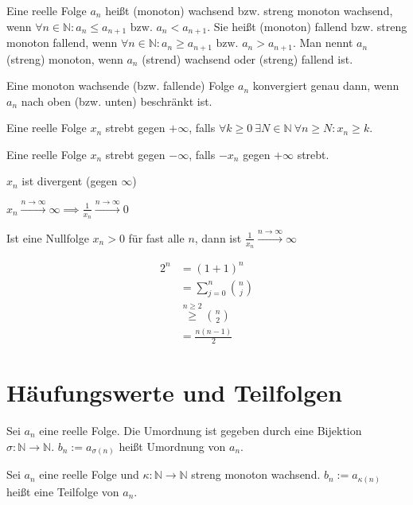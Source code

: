 \begin{definition}
  Eine reelle Folge $a_n$ heißt (monoton) wachsend bzw. streng monoton wachsend, wenn $\forall n \in \mathbb{N}: a_n \le a_{n+1} \text{ bzw. } a_n < a_{n+1}$. Sie heißt (monoton) fallend bzw. streng monoton fallend, wenn $\forall n \in \mathbb{N}: a_n \ge a_{n+1} \text{ bzw. } a_n > a_{n+1}$. Man nennt $a_n$ (streng) monoton, wenn $a_n$ (strend) wachsend oder (streng) fallend ist.
\end{definition}

\begin{theorem}
  Eine monoton wachsende (bzw. fallende) Folge $a_n$ konvergiert genau dann, wenn $a_n$ nach oben (bzw. unten) beschränkt ist.
\end{theorem}

\begin{definition}
  Eine reelle Folge $x_n$ strebt gegen $+\infty$, falls $\forall k \ge 0\: \exists N \in \mathbb{N}\: \forall n \ge N: x_n \ge k$.

  Eine reelle Folge $x_n$ strebt gegen $-\infty$, falls $-x_n$ gegen $+\infty$ strebt.
\end{definition}

\begin{example}
  $x_n$ ist divergent (gegen $\infty$)
\end{example}

\begin{theorem}
  $x_n \xrightarrow{n \to \infty} \infty \implies \frac{1}{x_n} \xrightarrow{n \to \infty} 0$

  Ist eine Nullfolge $x_n > 0$ für fast alle $n$, dann ist $\frac{1}{x_n} \xrightarrow{n \to \infty} \infty$
\end{theorem}

\begin{example}[$\frac{n}{2^n} \to 0$]
  \begin{align*}
    2^n &= (1+1)^n \\
    \,&= \sum_{j=0}^n \binom{n}{j} \\
    \,&\stackrel{n\ge2}{\ge} \binom{n}{2} \\
    \,&= \frac{n(n-1)}{2}
  \end{align*}
\end{example}

\section{Häufungswerte und Teilfolgen}
\begin{definition}[Umordnung]
  Sei $a_n$ eine reelle Folge. Die Umordnung ist gegeben durch eine Bijektion $\sigma: \mathbb{N} \to \mathbb{N}$. $b_n := a_{\sigma(n)}$ heißt Umordnung von $a_n$.
\end{definition}
\begin{definition}[Teilfolge]
  Sei $a_n$ eine reelle Folge und $\kappa: \mathbb{N} \to \mathbb{N}$ streng monoton wachsend. $b_n := a_{\kappa(n)}$ heißt eine Teilfolge von $a_n$.
\end{definition}

